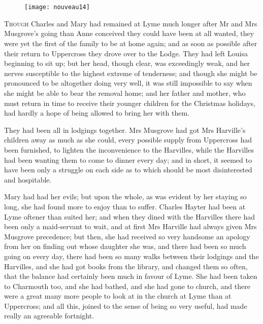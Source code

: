 \chapter[Chapter \thechapter]{}

\begin{figure}[t!]
\centering
\texttt{[image: nouveau14]}
\end{figure}

\lettrine[lines=4,lraise=0.3]{T}{hough} Charles and Mary had remained at Lyme much longer after Mr and Mrs Musgrove's going than Anne conceived they could have been at all wanted, they were yet the first of the family to be at home again; and as soon as possible after their return to Uppercross they drove over to the Lodge. They had left Louisa beginning to sit up; but her head, though clear, was exceedingly weak, and her nerves susceptible to the highest extreme of tenderness; and though she might be pronounced to be altogether doing very well, it was still impossible to say when she might be able to bear the removal home; and her father and mother, who must return in time to receive their younger children for the Christmas holidays, had hardly a hope of being allowed to bring her with them.

They had been all in lodgings together. Mrs Musgrove had got Mrs Harville's children away as much as she could, every possible supply from Uppercross had been furnished, to lighten the inconvenience to the Harvilles, while the Harvilles had been wanting them to come to dinner every day; and in short, it seemed to have been only a struggle on each side as to which should be most disinterested and hospitable.

Mary had had her evils; but upon the whole, as was evident by her staying so long, she had found more to enjoy than to suffer. Charles Hayter had been at Lyme oftener than suited her; and when they dined with the Harvilles there had been only a maid-servant to wait, and at first Mrs Harville had always given Mrs Musgrove precedence; but then, she had received so very handsome an apology from her on finding out whose daughter she was, and there had been so much going on every day, there had been so many walks between their lodgings and the Harvilles, and she had got books from the library, and changed them so often, that the balance had certainly been much in favour of Lyme. She had been taken to Charmouth too, and she had bathed, and she had gone to church, and there were a great many more people to look at in the church at Lyme than at Uppercross; and all this, joined to the sense of being so very useful, had made really an agreeable fortnight.

